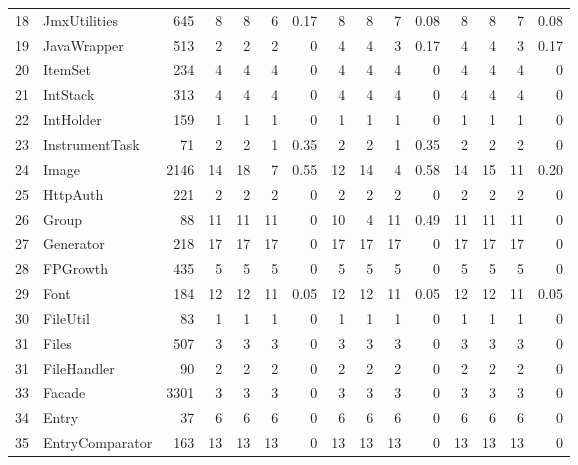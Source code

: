\documentclass{acm_proc_article-sp}
\begin{document}
\begin{table} [htp!]
{\begin{tabularx}{1.17 \textwidth}{r l r r r r r r r r r r r r r}
 18						& JmxUtilities					&645		& 8		&	8	&	6	& 	0.17					& 8		& 8 		& 7		& 		0.08			& 8			& 8			& 7			&	0.08\\      
 19						& JavaWrapper				&513		& 2		&	2	&	2	& 	0					& 4		& 4 		& 3		& 		0.17			& 4			& 4			& 3			&	0.17\\      
 20						& ItemSet					&234		& 4		&	4	&	4	& 	0					& 4		& 4 		& 4		& 		0			& 4			& 4			& 4			&	0	\\      
 21						& IntStack					&313		& 4		&	4	&	4	& 	0					& 4		& 4 		& 4		& 		0			& 4			& 4			& 4			&	0	\\      
 22						& IntHolder					&159		& 1		&	1	&	1	& 	0					& 1		& 1 		& 1		& 		0			& 1			& 1			& 1			&	0	\\      
 23						& InstrumentTask				&71		& 2		&	2	&	1	& 	0.35					& 2		& 2 		& 1		& 		0.35			& 2			& 2			& 2			&	0	\\      
 24						& Image					&2146		& 14		&	18	&	7	& 	0.55					& 12		& 14 		& 4		& 		0.58			& 14			& 15			& 11			&	0.20\\      
 25						& HttpAuth					&221		& 2		&	2	&	2	& 	0					& 2		& 2 		& 2		& 		0			& 2			& 2			& 2			&	0	\\      
 26						& Group					&88		& 11		&	11	&	11	& 	0					& 10		& 4 		& 11		& 		0.49			& 11			& 11			& 11			&	0	\\      
 27						& Generator					&218		& 17		&	17	&	17	& 	0					& 17		& 17 		& 17		& 		0			& 17			& 17			& 17			&	0	\\      
 28						& FPGrowth					&435		& 5		&	5	&	5	& 	0					& 5		&  5		& 5		& 		0			& 5			& 5			& 5			&	0	\\      
 29						& Font					&184		&12		&	12	&	11	& 	0.05					& 12		& 12 		& 11		& 		0.05			& 12			& 12			& 11			&	0.05\\      
 30						& FileUtil					&83		& 1		&	1	&	1	& 	0					& 1		& 1 		& 1		& 		0			& 1			& 1			& 1			&	0\\      
 31						& Files						&507		& 3		&	3	&	3	& 	0					& 3		& 3 		& 3		& 		0			& 3			& 3			& 3			&	0\\      
 31						& FileHandler					&90		& 2		&	2	&	2	& 	0					& 2		& 2 		& 2		& 		0			& 2			& 2			& 2			&	0\\      
 33						& Facade					&3301		& 3		&	3	&	3	& 	0					& 3		& 3 		& 3		& 		0			& 3			& 3			& 3			&	0\\      
 34						& Entry					&37		& 6		&	6	&	6	& 	0					& 6		& 6 		& 6		& 		0			& 6			& 6			& 6			&	0\\      
 35						& EntryComparator				&163		& 13		&	13	&	13	& 	0					& 13		& 13 		& 13		& 		0			& 13			& 13			& 13			&	0\\      

\end{tabularx}}
\end{table}
\end{document}
